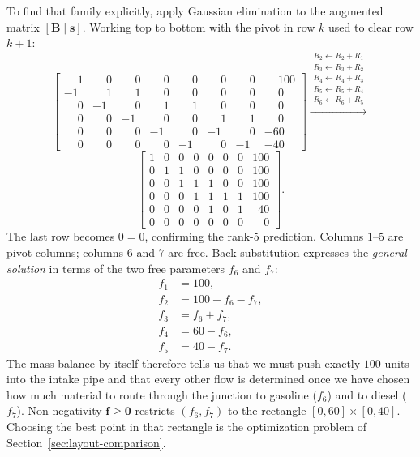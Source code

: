 \documentclass[11pt,a4paper]{article}
\newcommand{\mat}[1]{\mathbf{#1}}
\newcommand{\vect}[1]{\mathbf{#1}}
\begin{document}
To find that family explicitly, apply Gaussian elimination to the
augmented matrix $[\mat{B} \mid \vect{s}]$. Working top to bottom with
the pivot in row $k$ used to clear row $k+1$:
\[
\left[\begin{array}{ccccccc|c}
 \phantom{-}1 & \phantom{-}0 & \phantom{-}0 & \phantom{-}0 & \phantom{-}0 & \phantom{-}0 & \phantom{-}0 & \phantom{-}100 \\
 -1 & \phantom{-}1 & \phantom{-}1 & \phantom{-}0 & \phantom{-}0 & \phantom{-}0 & \phantom{-}0 & \phantom{-}0 \\
 \phantom{-}0 & -1 & \phantom{-}0 & \phantom{-}1 & \phantom{-}1 & \phantom{-}0 & \phantom{-}0 & \phantom{-}0 \\
 \phantom{-}0 & \phantom{-}0 & -1 & \phantom{-}0 & \phantom{-}0 & \phantom{-}1 & \phantom{-}1 & \phantom{-}0 \\
 \phantom{-}0 & \phantom{-}0 & \phantom{-}0 & -1 & \phantom{-}0 & -1 & \phantom{-}0 & -60 \\
 \phantom{-}0 & \phantom{-}0 & \phantom{-}0 & \phantom{-}0 & -1 & \phantom{-}0 & -1 & -40
\end{array}\right]
\xrightarrow{\substack{R_2 \gets R_2 + R_1 \\ R_3 \gets R_3 + R_2 \\ R_4 \gets R_4 + R_3 \\ R_5 \gets R_5 + R_4 \\ R_6 \gets R_6 + R_5}}
\]
\[
\left[\begin{array}{ccccccc|c}
 1 & 0 & 0 & 0 & 0 & 0 & 0 & 100 \\
 0 & 1 & 1 & 0 & 0 & 0 & 0 & 100 \\
 0 & 0 & 1 & 1 & 1 & 0 & 0 & 100 \\
 0 & 0 & 0 & 1 & 1 & 1 & 1 & 100 \\
 0 & 0 & 0 & 0 & 1 & 0 & 1 & \phantom{0}40 \\
 0 & 0 & 0 & 0 & 0 & 0 & 0 & \phantom{00}0
\end{array}\right].
\]
The last row becomes $0 = 0$, confirming the rank-$5$ prediction.
Columns $1$--$5$ are pivot columns; columns $6$ and $7$ are free. Back
substitution expresses the \emph{general solution} in terms of the two
free parameters $f_6$ and $f_7$:
\begin{equation}
\begin{aligned}
  f_1 &= 100,\\
  f_2 &= 100 - f_6 - f_7,\\
  f_3 &= f_6 + f_7,\\
  f_4 &= 60 - f_6,\\
  f_5 &= 40 - f_7.
\end{aligned}
\label{eq:general-flow}
\end{equation}
The mass balance by itself therefore tells us that we must push exactly
$100$ units into the intake pipe and that every other flow is
determined once we have chosen how much material to route through the
junction to gasoline ($f_6$) and to diesel ($f_7$). Non-negativity
$\vect{f} \ge \vect{0}$ restricts $(f_6, f_7)$ to the rectangle
$[0, 60] \times [0, 40]$. Choosing the best point in that rectangle is
the optimization problem of Section~\ref{sec:layout-comparison}.
\end{document}
